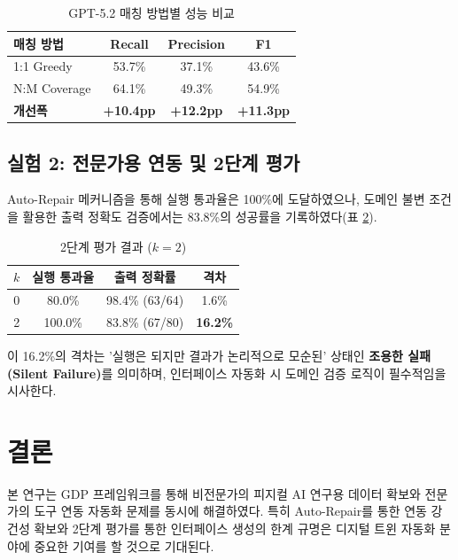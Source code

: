 \documentclass[conference]{IEEEtran}
\begin{document}
\begin{table}[htbp]
\caption{GPT-5.2 매칭 방법별 성능 비교}
\label{tab:gpt52_comparison}
\centering
\begin{tabular}{l c c c}
\hline
\textbf{매칭 방법} & \textbf{Recall} & \textbf{Precision} & \textbf{F1} \\
\hline
1:1 Greedy       & 53.7\% & 37.1\% & 43.6\% \\
N:M Coverage      & 64.1\% & 49.3\% & 54.9\% \\
\hline
\textbf{개선폭}  & \textbf{+10.4pp} & \textbf{+12.2pp} & \textbf{+11.3pp} \\
\hline
\end{tabular}
\end{table}

\subsection{실험 2: 전문가용 연동 및 2단계 평가}
Auto-Repair 메커니즘을 통해 실행 통과율은 100\%에 도달하였으나, 도메인 불변 조건을 활용한 출력 정확도 검증에서는 83.8\%의 성공률을 기록하였다(표 \ref{tab:two_tier}).

\begin{table}[htbp]
\caption{2단계 평가 결과 ($k=2$)}
\label{tab:two_tier}
\centering
\begin{tabular}{c c c c}
\hline
$k$ & \textbf{실행 통과율} & \textbf{출력 정확률} & \textbf{격차} \\
\hline
0 & 80.0\%  & 98.4\% (63/64)  & 1.6\% \\
2 & 100.0\% & 83.8\% (67/80)  & \textbf{16.2\%} \\
\hline
\end{tabular}
\end{table}

이 16.2\%의 격차는 '실행은 되지만 결과가 논리적으로 모순된' 상태인 \textbf{조용한 실패(Silent Failure)}를 의미하며, 인터페이스 자동화 시 도메인 검증 로직이 필수적임을 시사한다.

\section{결론}
본 연구는 GDP 프레임워크를 통해 비전문가의 피지컬 AI 연구용 데이터 확보와 전문가의 도구 연동 자동화 문제를 동시에 해결하였다. 특히 Auto-Repair를 통한 연동 강건성 확보와 2단계 평가를 통한 인터페이스 생성의 한계 규명은 디지털 트윈 자동화 분야에 중요한 기여를 할 것으로 기대된다.
\end{document}
